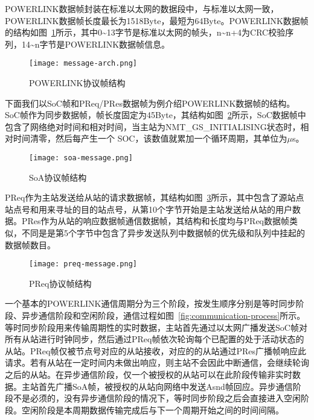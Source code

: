 \begin{itemize}
\begin{table}[hbt]
\end{table}

POWERLINK数据帧封装在标准以太网的数据段中，与标准以太网一致，POWERLINK数据帧长度最长为1518Byte，最短为64Byte。POWERLINK数据帧的结构如图~\ref{fig:message-arch}所示，其中0\textasciitilde13字节是标准以太网的帧头，n\textasciitilde n+4为CRC校验序列，14\textasciitilde n字节是POWERLINK数据帧信息。

\begin{figure}[!htb]
  \centering
  \texttt{[image: message-arch.png]}
  \caption{POWERLINK协议帧结构}
  \label{fig:message-arch}
\end{figure}

下面我们以SoC帧和PReq/PRes数据帧为例介绍POWERLINK数据帧的结构。SoC帧作为同步数据帧，帧长度固定为45Byte，其结构如图~\ref{fig:soa-message}所示，SoC数据帧中包含了网络绝对时间和相对时间，当主站为NMT\_GS\_INITIALISING状态时，相对时间清零，然后每产生一个 SOC，该数值就累加一个循环周期，其单位为$\mu$s。

\begin{figure}[!htb]
  \centering
  \texttt{[image: soa-message.png]}
  \caption{SoA协议帧结构}
  \label{fig:soa-message}
\end{figure}

PReq作为主站发送给从站的请求数据帧，其结构如图~\ref{fig:preq-message}所示，其中包含了源站点站点号和用来寻址的目的站点号，从第10个字节开始是主站发送给从站的用户数据。PRes作为从站的响应数据帧通信数据帧，其结构和长度均与PReq数据帧类似，不同是是第5个字节中包含了异步发送队列中数据帧的优先级和队列中挂起的数据帧数目。

\begin{figure}[!htb]
  \centering
  \texttt{[image: preq-message.png]}
  \caption{PReq协议帧结构}
  \label{fig:preq-message}
\end{figure}

一个基本的POWERLINK通信周期分为三个阶段，按发生顺序分别是等时同步阶段、异步通信阶段和空闲阶段，通信过程如图~\ref{fig:communication-process}所示。等时同步阶段用来传输周期性的实时数据，主站首先通过以太网广播发送SoC帧对所有从站进行时钟同步，然后通过PReq帧依次轮询每个已配置的处于活动状态的从站。PReq帧仅被节点号对应的从站接收，对应的的从站通过PRes广播帧响应此请求。若有从站在一定时间内未做出响应，则主站不会因此中断通信，会继续轮询之后的从站。在异步通信阶段，仅一个被授权的从站可以在此阶段传输非实时数据。主站首先广播SoA帧，被授权的从站向网络中发送Asnd帧回应。异步通信阶段不是必须的，没有异步通信阶段的情况下，等时同步阶段之后会直接进入空闲阶段。空闲阶段是本周期数据传输完成后与下一个周期开始之间的时间间隔。



\end{itemize}
